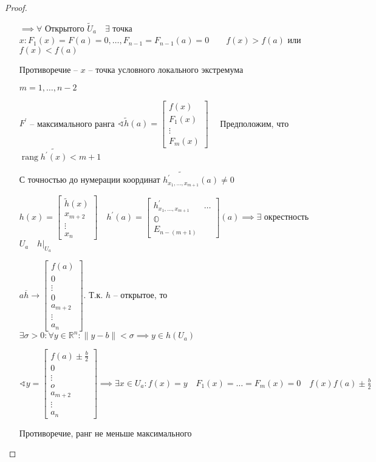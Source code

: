 \documentclass{book}
\newcommand\R{\ensuremath{\mathbb{R}}}
\newcommand{\p}[1]{#1^{\prime}}
\newcommand{\tl}[1]{\widetilde{#1}}
\newcommand{\ov}[1]{\overline{#1}}
\theoremstyle{definition}
\DeclareMathOperator{\rang}{rang}
\begin{document}
\begin{proof}
\begin{enumerate}
                $\implies \forall $ Открытого $\tl U_a\quad \exists $ точка $x: F_1(x) = F(a) = 0, \ldots, F_{n-1} = F_{n-1}(a) = 0 \qquad f(x) > f(a)$ или $f(x) < f(a)$

                Противоречие --  $x$ -- точка условного локального экстремума
        \item [$m=1, \ldots, n-2$]

            $\p F$ -- максимального ранга  $\sphericalangle \tl h(a) = \begin{bmatrix} f(x) \\ F_1(x)\\ \vdots \\  F_m\left( x \right)  \end{bmatrix} \quad $ Предположим, что $\rang \tl{\p h(x)}<m+1$

            С точностью до нумерации координат $\tl {\p h_{x_1, \ldots, x_{m+1}}}(a)\neq 0$

                $h(x) = \begin{bmatrix} \tl h(x)\\ x_{m+2} \\ \vdots \\ x_{n}  \end{bmatrix} \quad \p h(a) = \begin{bmatrix} \p h_{x_1, \ldots, x_{m+1} }&\ldots\\ \mathbb O\\ E_{n-(m+1)} \end{bmatrix} (a) \implies \exists $ окрестность $U_a\quad h|_{U_a}$

                $a \ov h {\to } \begin{bmatrix} f(a)\\ 0 \\ \vdots \\ 0 \\ a_{m+2} \\ \vdots \\ a_n \end{bmatrix} $. Т.к. $h$ -- открытое, то  $\exists  \sigma>0 :\forall y\in \R^n: \|y - b\|<\sigma \implies y\in h(U_a)$

                $\sphericalangle y = \begin{bmatrix} f(a)\pm \frac{b}{2}\\ 0 \\ \vdots \\ o \\ a_{m+2} \\ \vdots \\ a_n \end{bmatrix} \implies \exists x\in U_a: f(x) = y\quad F_1(x) = \ldots = F_m(x) = 0\quad f(x) f(a) \pm \frac{b}{2}$ 

               Противоречие, ранг не меньше максимального
    \end{enumerate}
\end{proof}
\end{document}

